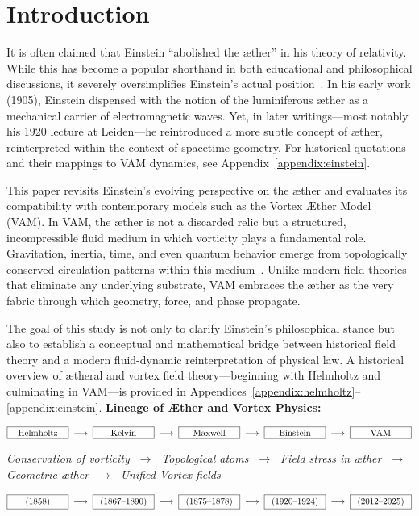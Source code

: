 \documentclass[preprint]{revtex4-2}
\begin{document}
\section{Introduction}

It is often claimed that Einstein ``abolished the æther'' in his theory of relativity. While this has become a popular shorthand in both educational and philosophical discussions, it severely oversimplifies Einstein's actual position~\cite{einstein1920aether}. In his early work (1905), Einstein dispensed with the notion of the luminiferous æther as a mechanical carrier of electromagnetic waves. Yet, in later writings—most notably his 1920 lecture at Leiden—he reintroduced a more subtle concept of æther, reinterpreted within the context of spacetime geometry.
For historical quotations and their mappings to VAM dynamics, see Appendix~\ref{appendix:einstein}.


This paper revisits Einstein’s evolving perspective on the æther and evaluates its compatibility with contemporary models such as the Vortex Æther Model (VAM). In VAM, the æther is not a discarded relic but a structured, incompressible fluid medium in which vorticity plays a fundamental role. Gravitation, inertia, time, and even quantum behavior emerge from topologically conserved circulation patterns within this medium~\cite{iskandarani2025vam1, iskandarani2025vam2}. Unlike modern field theories that eliminate any underlying substrate, VAM embraces the æther as the very fabric through which geometry, force, and phase propagate.

The goal of this study is not only to clarify Einstein's philosophical stance but also to establish a conceptual and mathematical bridge between historical field theory and a modern fluid-dynamic reinterpretation of physical law. A historical overview of ætheral and vortex field theory—beginning with Helmholtz and culminating in VAM—is provided in Appendices~\ref{appendix:helmholtz}–\ref{appendix:einstein}.
\vspace{1em}
\noindent\textbf{Lineage of Æther and Vortex Physics:}

\[
\fbox{\makebox[2.2cm][c]{Helmholtz}} \;\longrightarrow\;
\fbox{\makebox[2.2cm][c]{Kelvin}} \;\longrightarrow\;
\fbox{\makebox[2.2cm][c]{Maxwell}} \;\longrightarrow\;
\fbox{\makebox[2.2cm][c]{Einstein}} \;\longrightarrow\;
\fbox{\makebox[2.2cm][c]{VAM}}
\]

\begin{center}
\scriptsize
\textit{
Conservation of vorticity $\;\rightarrow\;$ Topological atoms $\;\rightarrow\;$ Field stress in æther $\;\rightarrow\;$ Geometric æther $\;\rightarrow\;$ Unified Vortex-fields
}
\end{center}
\[
\fbox{\makebox[2.2cm][c]{(1858)}} \;\longrightarrow\;
\fbox{\makebox[2.2cm][c]{(1867--1890)}} \;\longrightarrow\;
\fbox{\makebox[2.2cm][c]{(1875--1878)}} \;\longrightarrow\;
\fbox{\makebox[2.2cm][c]{(1920--1924)}} \;\longrightarrow\;
\fbox{\makebox[2.2cm][c]{(2012--2025)}}
\]
\end{document}
